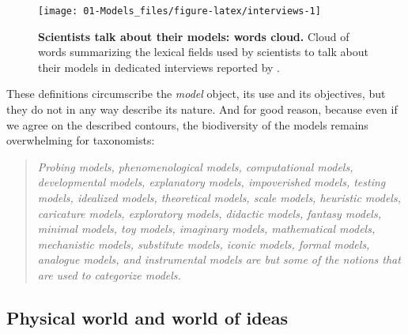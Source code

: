 \documentclass[a4paper,12pt,twoside,onecolumn,openright,final,oldfontcommands]{memoir}
\begin{document}
\begin{figure}

{\centering \texttt{[image: 01-Models\_files/figure-latex/interviews-1]} 

}

\caption[Scientists talk about their models: words cloud.]{\textbf{Scientists talk about their models:
words cloud.} Cloud of words summarizing the lexical fields used by
scientists to talk about their models in dedicated interviews reported
by \citet{bailer2002scientists}.}\label{fig:interviews}
\end{figure}






These definitions circumscribe the \emph{model} object, its use and its
objectives, but they do not in any way describe its nature. And for good
reason, because even if we agree on the described contours, the
biodiversity of the models remains overwhelming for taxonomists:

\begin{quote}
\emph{Probing models, phenomenological models, computational models,
developmental models, explanatory models, impoverished models, testing
models, idealized models, theoretical models, scale models, heuristic
models, caricature models, exploratory models, didactic models, fantasy
models, minimal models, toy models, imaginary models, mathematical
models, mechanistic models, substitute models, iconic models, formal
models, analogue models, and instrumental models are but some of the
notions that are used to categorize models.}\\
\citep{frigg2020models}
\end{quote}

\subsection{Physical world and world of
ideas}\label{physical-world-and-world-of-ideas}
\end{document}
